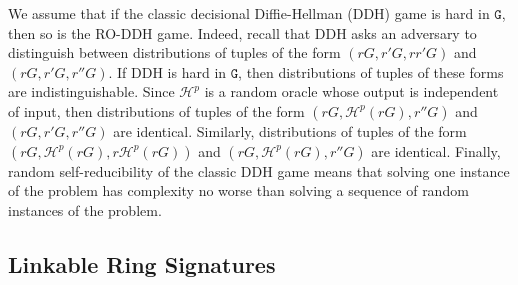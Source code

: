 \documentclass{llncs}
\newcommand{\G}{\texttt{G}}
\newcommand{\Hp}{\mathcal{H}^p}
\begin{document}
\begin{remark}
We assume that if the classic decisional Diffie-Hellman (DDH) game is hard in $\G$, then so is the RO-DDH game. Indeed, recall that DDH asks an adversary to distinguish between distributions of tuples of the form $(rG,r'G,rr'G)$ and $(rG,r'G,r''G)$. If DDH is hard in $\G$, then distributions of tuples of these forms are indistinguishable. Since $\Hp$ is a random oracle whose output is independent of input, then distributions of tuples of the form $(rG,\Hp(rG),r''G)$ and $(rG,r'G,r''G)$ are identical. Similarly, distributions of tuples of the form $(rG,\Hp(rG),r\Hp(rG))$ and $(rG,\Hp(rG),r''G)$ are identical. Finally, random self-reducibility of the classic DDH game means that solving one instance of the problem has complexity no worse than solving a sequence of random instances of the problem.
\end{remark}


\subsection{Linkable Ring Signatures}
\end{document}
